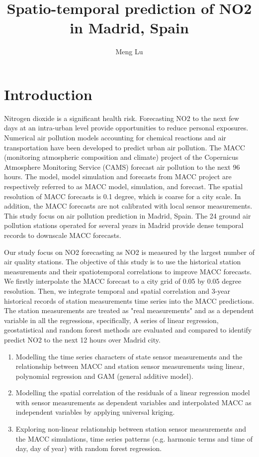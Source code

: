 \documentclass{article}
\title{Spatio-temporal prediction of NO2 in Madrid, Spain}
\author{Meng Lu}
\begin{document}
\maketitle


\section{Introduction}

 

Nitrogen dioxide is a significant health risk. Forecasting NO2 to the next few days at an intra-urban level provide opportunities to reduce personal exposures. Numerical air pollution models accounting for chemical reactions and air transportation have been developed to predict urban air pollution.
The MACC (monitoring atmospheric composition and climate) project \cite{MACC} of the Copernicus Atmosphere Monitoring Service (CAMS) forecast air pollution to the next 96 hours. The model, model simulation and forecasts from MACC project are respectively referred to as MACC model, simulation, and forecast. The spatial resolution of MACC forecasts is 0.1 degree, which is coarse for a city scale. In addition, the MACC forecasts are not calibrated with local sensor measurements. This study focus on air pollution prediction in Madrid, Spain. The 24 ground air pollution stations operated for several years in Madrid provide dense temporal records to downscale MACC forecasts. 

Our study focus on NO2 forecasting as NO2 is measured by the largest number of air quality stations. The objective of this study is to use the historical station measurements and their spatiotemporal correlations to improve MACC forecasts. We firstly interpolate the MACC forecast to a city grid of 0.05 by 0.05 degree resolution. Then, we integrate temporal and spatial correlation and 3-year historical records of station  measurements time series into the MACC predictions. The station measurements are treated as "real measurements" and as a dependent variable in all the regressions, specifically, A series of linear regression, geostatistical and random forest methods are evaluated and compared to identify predict NO2 to the next 12 hours over Madrid city. 

\begin{enumerate} 
    \item  Modelling the time series characters of state sensor measurements and the relationship between MACC and station sensor measurements using linear, polynomial regression and GAM (general additive model). 
     
    \item  Modelling the spatial correlation of the residuals of a linear regression model with sensor measurements as dependent variables and interpolated MACC as independent variables by applying universal kriging. 
    
    \item  Exploring non-linear relationship between station sensor measurements and the MACC simulations, time series patterns (e.g. harmonic terms and time of day, day of year) with random forest regression.
\end{enumerate}
\end{document}
